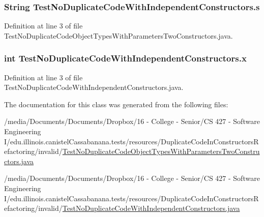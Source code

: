 \hypertarget{classTestNoDuplicateCodeWithIndependentConstructors_a8ef7e3cb54347f1d3d4742360c32050d}{
\subsubsection[{s}]{\setlength{\rightskip}{0pt plus 5cm}String {\bf TestNoDuplicateCodeWithIndependentConstructors.s}}}
\label{classTestNoDuplicateCodeWithIndependentConstructors_a8ef7e3cb54347f1d3d4742360c32050d}


Definition at line 3 of file TestNoDuplicateCodeObjectTypesWithParametersTwoConstructors.java.

\hypertarget{classTestNoDuplicateCodeWithIndependentConstructors_a4c7d7315f9fe7725bacae551f368ae5d}{
\subsubsection[{x}]{\setlength{\rightskip}{0pt plus 5cm}int {\bf TestNoDuplicateCodeWithIndependentConstructors.x}}}
\label{classTestNoDuplicateCodeWithIndependentConstructors_a4c7d7315f9fe7725bacae551f368ae5d}


Definition at line 3 of file TestNoDuplicateCodeWithIndependentConstructors.java.



The documentation for this class was generated from the following files:\begin{DoxyCompactItemize}
\item 
/media/Documents/Documents/Dropbox/16 -\/ College -\/ Senior/CS 427 -\/ Software Engineering I/edu.illinois.canistelCassabanana.tests/resources/DuplicateCodeInConstructorsRefactoring/invalid/\hyperlink{TestNoDuplicateCodeObjectTypesWithParametersTwoConstructors_8java}{TestNoDuplicateCodeObjectTypesWithParametersTwoConstructors.java}\item 
/media/Documents/Documents/Dropbox/16 -\/ College -\/ Senior/CS 427 -\/ Software Engineering I/edu.illinois.canistelCassabanana.tests/resources/DuplicateCodeInConstructorsRefactoring/invalid/\hyperlink{TestNoDuplicateCodeWithIndependentConstructors_8java}{TestNoDuplicateCodeWithIndependentConstructors.java}\end{DoxyCompactItemize}
